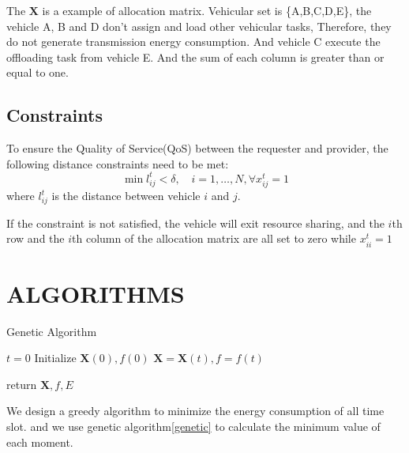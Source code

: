 \documentclass[conference]{IEEEtran}
\begin{document}
	The $\mathbf{X}$ is a example of allocation matrix. Vehicular set is \{A,B,C,D,E\}, the vehicle A, B and D don't assign and load other vehicular tasks, Therefore, they do not generate transmission energy consumption. And vehicle C execute the offloading task from vehicle E. And the sum of each column is greater than or equal to one.

\subsection{Constraints}
To ensure the Quality of Service(QoS) between the requester and provider, the following distance constraints need to be met:
\begin{equation}
	\min\limits_{ }
	l_{ij}^{t}<\delta
	,\quad
	i = 1,\dots,N,\forall x_{ij}^{t} =1
\end{equation}
where $l_ {ij}^{t}$ is the distance between vehicle $i$ and  $j$. 

	If the constraint is not satisfied, the vehicle will exit resource sharing, and the $i$th row and the $i$th column of the allocation matrix are all set to zero while $x_{ii}^{t}=1$


\section{ALGORITHMS}
\begin{algorithm}[t]
	\SetAlgoLined %
	\caption{Genetic Algorithm}%
	\label{genetic}
	$t = 0  $ \;
	Initialize $\mathbf{X}(0), f(0)$  \;
	$\mathbf{X} =\mathbf{X}(t) , f = f(t)$ \;
	
	return $\mathbf{X}, f, E$ 
\end{algorithm}
	We design a greedy algorithm to minimize the energy consumption of all time slot. 
	and we use genetic algorithm\ref{genetic} to calculate the minimum value of each moment.
\end{document}
